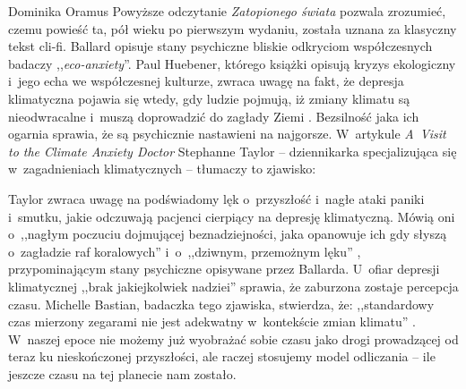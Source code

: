 \begin{artplenv}{Dominika Oramus}
Powyższe odczytanie \textit{Zatopionego świata} pozwala zrozumieć, czemu powieść ta, pół wieku po pierwszym wydaniu, została uznana za klasyczny tekst cli-fi. Ballard opisuje stany psychiczne bliskie odkryciom współczesnych badaczy ,,\textit{eco-anxiety}''. Paul Huebener, którego książki opisują kryzys ekologiczny i~jego echa we współczesnej kulturze, zwraca uwagę na fakt, że depresja klimatyczna pojawia się wtedy, gdy ludzie pojmują, iż zmiany klimatu są nieodwracalne i~muszą doprowadzić do zagłady Ziemi
\parencite[][]{huebener_natures_2020}. %
 Bezsilność jaka ich ogarnia sprawia, że są psychicznie nastawieni na najgorsze. W~artykule \textit{A~Visit to the Climate Anxiety Doctor} Stephanne Taylor -- dziennikarka specjalizująca się w~zagadnieniach klimatycznych -- tłumaczy to zjawisko:


Taylor zwraca uwagę na podświadomy lęk o~przyszłość i~nagłe ataki paniki i~smutku, jakie odczuwają pacjenci cierpiący na depresję klimatyczną. Mówią oni o~,,nagłym poczuciu dojmującej beznadziejności, jaka opanowuje ich gdy słyszą o~zagładzie raf koralowych''
i~o~,,dziwnym, przemożnym lęku''
\parencite[][tłum. D.O.]{taylor_visit_2016}, %
 przypominającym stany psychiczne opisywane przez Ballarda. U~ofiar depresji klimatycznej ,,brak jakiejkolwiek nadziei''
\parencite{hamilton_climate_2016}
 sprawia, że zaburzona zostaje percepcja czasu. Michelle Bastian, badaczka tego zjawiska, stwierdza, że: ,,standardowy czas mierzony zegarami nie jest adekwatny w~kontekście zmian klimatu'' 
\parencite[][s.~39]{bastian_fatally_2012}. %
 W~naszej epoce nie możemy już wyobrażać sobie czasu jako drogi prowadzącej od teraz ku nieskończonej przyszłości, ale raczej stosujemy model odliczania -- ile jeszcze czasu na tej planecie nam zostało.


\end{artplenv}
